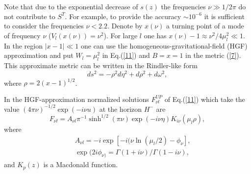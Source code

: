 \documentclass[superscriptaddress,showpacs,preprintnumbers,amsmath,amssymb,
nofootinbib,aps,prd,12pt]{revtex4-1}
\begin{document}
Note  that due to  the exponential decrease of $s(z)$  the frequencies
$\nu \gg  1/2\pi$ do  not contribute   to   $S^T$.   For example, to
provide  the accuracy  $\sim 10^{-6}$ it is sufficient to consider the
frequencies $\nu <2.2$. Denote by $x(\nu )$ a turning point of a mode
of frequency $\nu$ ($V_l (x(\nu ))=\nu^2$).  For  large  $l$ one has
$x(\nu )-1\approx \nu ^2  /4\mu_l^2 \ll 1$. In the region $|x-1|\ll
1$ one  can  use the homogeneous-gravitational-field  (HGF)
approximation   and   put $W_l  =\mu_l^2$  in  Eq.(\ref{11})  and  $B=x=1$
in  the metric (\ref{7}). This approximate metric can be written in the
Rindler-like form
\begin{equation}
ds^2 =-\rho^2 d\eta^2 +d\rho^2 +d\omega^2, \label{28a}
\end{equation}
where $\rho =2(x-1)^{1/2}$.

In the HGF-approximation normalized solutions $F_{\nu l}^{UP}$
of Eq.(\ref{11}) which take the value $(4\pi \nu )^{-1/2}\exp (-i\nu u)$
at the horizon $H^-$ are
\begin{equation}
F_{\nu l}=A_{\nu l}\pi ^{-1}\sinh ^{1/2}(\pi \nu )
\exp (-i\nu \eta ) K_{i\nu}(\mu _l \rho ) ,
\label{25}
\end{equation}
where
\begin{eqnarray}
&&A_{\nu l} =-i \exp [-i (\nu \ln (\mu _l /2)-\phi _{\nu}], \nonumber\\
&&\exp (2i \phi _{\nu)}=\Gamma (1+i\nu )/\Gamma (1- i\nu ),
\label{26}
\end{eqnarray}
and $K_p (z)$ is a Macdonald function.
\end{document}
